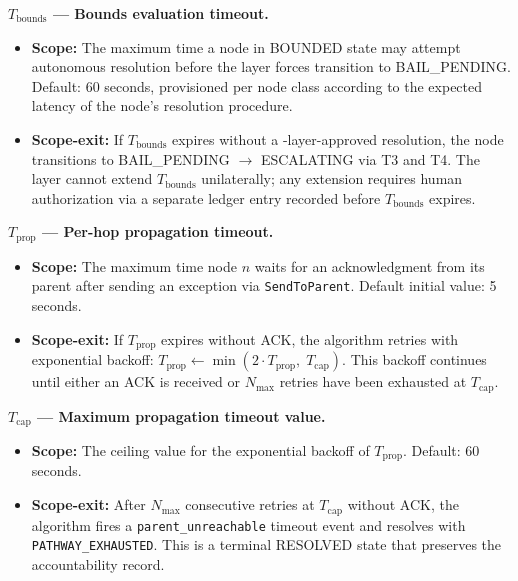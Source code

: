 \bigskip
\noindent\textbf{$T_{\text{bounds}}$ --- Bounds evaluation timeout.}

\begin{itemize}
    \item \textbf{Scope:} The maximum time a node in BOUNDED state may attempt autonomous resolution before the \fact{} layer forces transition to BAIL\_PENDING. Default: 60 seconds, provisioned per node class according to the expected latency of the node's resolution procedure.
    \item \textbf{Scope-exit:} If $T_{\text{bounds}}$ expires without a \fact-layer-approved resolution, the node transitions to BAIL\_PENDING $\rightarrow$ ESCALATING via T3 and T4. The \fact{} layer cannot extend $T_{\text{bounds}}$ unilaterally; any extension requires human authorization via a separate ledger entry recorded before $T_{\text{bounds}}$ expires.
\end{itemize}

\bigskip
\noindent\textbf{$T_{\text{prop}}$ --- Per-hop propagation timeout.}

\begin{itemize}
    \item \textbf{Scope:} The maximum time node $n$ waits for an acknowledgment from its parent after sending an exception via \texttt{SendToParent}. Default initial value: 5 seconds.
    \item \textbf{Scope-exit:} If $T_{\text{prop}}$ expires without ACK, the algorithm retries with exponential backoff: $T_{\text{prop}} \leftarrow \min(2 \cdot T_{\text{prop}},\; T_{\text{cap}})$. This backoff continues until either an ACK is received or $N_{\max}$ retries have been exhausted at $T_{\text{cap}}$.
\end{itemize}

\bigskip
\noindent\textbf{$T_{\text{cap}}$ --- Maximum propagation timeout value.}

\begin{itemize}
    \item \textbf{Scope:} The ceiling value for the exponential backoff of $T_{\text{prop}}$. Default: 60 seconds.
    \item \textbf{Scope-exit:} After $N_{\max}$ consecutive retries at $T_{\text{cap}}$ without ACK, the algorithm fires a \texttt{parent\_unreachable} timeout event and resolves with \texttt{PATHWAY\_EXHAUSTED}. This is a terminal RESOLVED state that preserves the accountability record.
\end{itemize}

